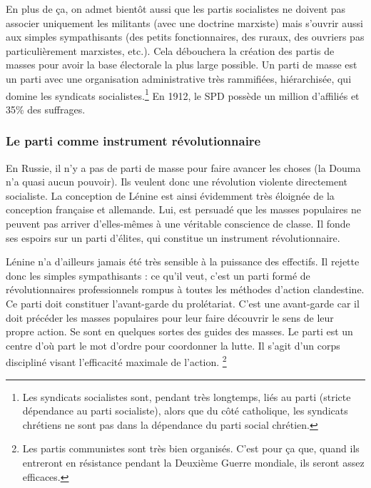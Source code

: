 \documentclass[12pt]{report}
\begin{document}
En plus de ça, on admet bientôt aussi que les partis socialistes ne doivent pas associer uniquement les militants (avec une doctrine marxiste) mais s’ouvrir aussi aux simples sympathisants (des petits fonctionnaires, des ruraux, des ouvriers pas particulièrement marxistes, etc.).
Cela débouchera la création des partis de masses pour avoir la base électorale la plus large possible.
Un parti de masse est un parti avec une organisation administrative très rammifiées, hiérarchisée, qui domine les syndicats socialistes.\footnote{Les syndicats socialistes sont, pendant très longtemps, liés au parti (stricte dépendance au parti socialiste), alors que du côté catholique, les syndicats chrétiens ne sont pas dans la dépendance du parti social chrétien.}
En 1912, le SPD possède un million d’affiliés et 35\% des suffrages. 

\subsubsection{Le parti comme instrument révolutionnaire}

En Russie, il n’y a pas de parti de masse pour faire avancer les choses (la Douma n’a quasi aucun pouvoir). 
Ils veulent donc une révolution violente directement socialiste. 
La conception de Lénine est ainsi évidemment très éloignée de la conception française et allemande.
Lui, est persuadé que les masses populaires ne peuvent pas arriver d'elles-mêmes à une véritable conscience de classe. Il fonde ses espoirs sur un parti d'élites, qui constitue un instrument révolutionnaire.

Lénine n'a d'ailleurs jamais été très sensible à la puissance des effectifs.
Il rejette donc les simples sympathisants : ce qu'il veut, c'est un parti formé de révolutionnaires professionnels rompus à toutes les méthodes d’action clandestine.
Ce parti doit constituer l’avant-garde du prolétariat.
C’est une avant-garde car il doit précéder les masses populaires pour leur faire découvrir le sens de leur propre action.
Se sont en quelques sortes des guides des masses.
Le parti est un centre d’où part le mot d’ordre pour coordonner la lutte.
Il s’agit d’un corps discipliné visant l’efficacité maximale de l’action.
\footnote{Les partis communistes sont très bien organisés. C'est pour ça que, quand ils entreront en résistance pendant la Deuxième Guerre mondiale, ils seront assez efficaces.}
\end{document}
